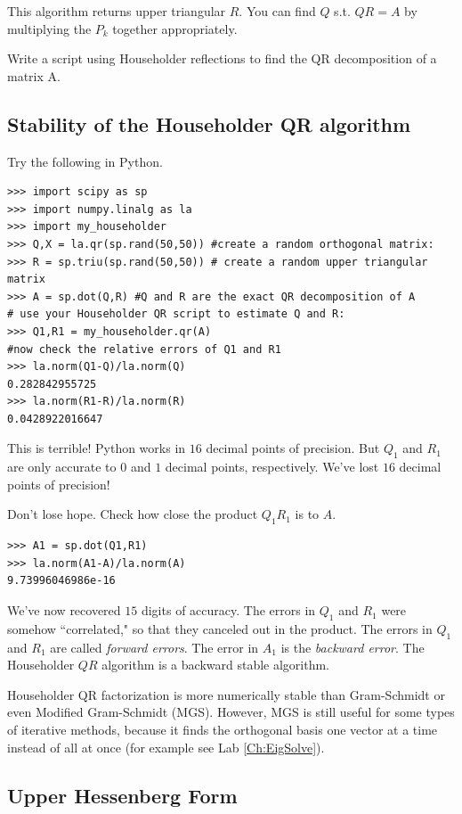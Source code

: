 This algorithm returns upper triangular $R$. You can find $Q$ s.t. $QR = A$ by multiplying the $P_k$ together appropriately.

\begin{problem}
\label{prob:HouseholderQR}
Write a script using Householder reflections to find the QR decomposition of a matrix A.
\end{problem}

\subsection*{Stability of the Householder QR algorithm}

Try the following in Python.

\begin{lstlisting}
>>> import scipy as sp
>>> import numpy.linalg as la
>>> import my_householder
>>> Q,X = la.qr(sp.rand(50,50)) #create a random orthogonal matrix:
>>> R = sp.triu(sp.rand(50,50)) # create a random upper triangular matrix
>>> A = sp.dot(Q,R) #Q and R are the exact QR decomposition of A
# use your Householder QR script to estimate Q and R:
>>> Q1,R1 = my_householder.qr(A)
#now check the relative errors of Q1 and R1
>>> la.norm(Q1-Q)/la.norm(Q)
0.282842955725
>>> la.norm(R1-R)/la.norm(R)
0.0428922016647
\end{lstlisting}
This is terrible! 
Python works in $16$ decimal points of precision. 
But $Q_1$ and $R_1$ are only accurate to $0$ and $1$ decimal points, respectively. 
We've lost $16$ decimal points of precision!

Don't lose hope. Check how close the product $Q_1 R_1$ is to $A$.
\begin{lstlisting}
>>> A1 = sp.dot(Q1,R1)
>>> la.norm(A1-A)/la.norm(A)
9.73996046986e-16
\end{lstlisting}
We've now recovered $15$ digits of accuracy. 
The errors in $Q_1$ and $R_1$ were somehow ``correlated," so that they canceled out in the product. 
The errors in $Q_1$ and $R_1$ are called \emph{forward errors}. 
The error in $A_1$ is the \emph{backward error}. 
The Householder $QR$ algorithm is a backward stable algorithm.

Householder QR factorization is more numerically stable than Gram-Schmidt or even Modified Gram-Schmidt (MGS). 
However, MGS is still useful for some types of iterative methods, because it finds the orthogonal basis one 
vector at a time instead of all at once (for example see Lab \ref{Ch:EigSolve}).

\subsection*{Upper Hessenberg Form}

